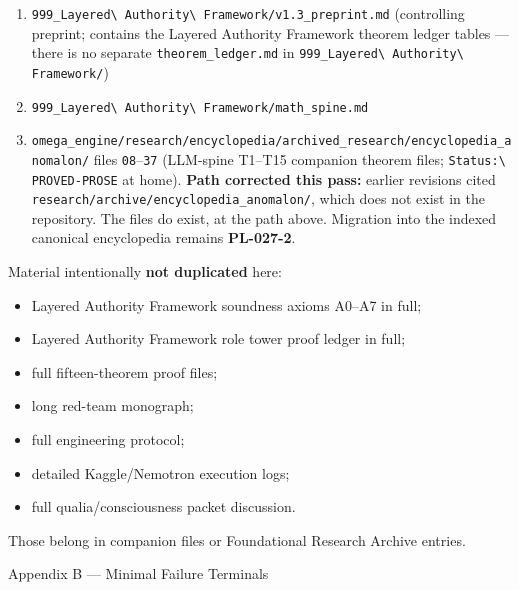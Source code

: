 \documentclass[
  10pt,
]{article}
\providecommand{\tightlist}{%
  \setlength{\itemsep}{0pt}\setlength{\parskip}{0pt}}
\providecommand{\tightlist}{%
  \setlength{\itemsep}{0pt}\setlength{\parskip}{0pt}}
\DeclareRobustCommand{\texttt}[1]{{\paperSymbolFont\nolinkurl{#1}}}
\begin{document}
\begin{enumerate}
\def\labelenumi{\arabic{enumi}.}
\tightlist
\item
  \texttt{999\_Layered\ Authority\ Framework/v1.3\_preprint.md} (controlling preprint; contains the Layered Authority Framework theorem ledger tables --- there is no separate \texttt{theorem\_ledger.md} in \texttt{999\_Layered\ Authority\ Framework/})
\item
  \texttt{999\_Layered\ Authority\ Framework/math\_spine.md}
\item
  \texttt{omega\_engine/research/encyclopedia/archived\_research/encyclopedia\_anomalon/} files \texttt{08}--\texttt{37} (LLM-spine T1--T15 companion theorem files; \texttt{Status:\ PROVED-PROSE} at home). \textbf{Path corrected this pass:} earlier revisions cited \texttt{research/archive/encyclopedia\_anomalon/}, which does not exist in the repository. The files do exist, at the path above. Migration into the indexed canonical encyclopedia remains \textbf{PL-027-2}.
\end{enumerate}

Material intentionally \textbf{not duplicated} here:

\begin{itemize}
\tightlist
\item
  Layered Authority Framework soundness axioms A0--A7 in full;
\item
  Layered Authority Framework role tower proof ledger in full;
\item
  full fifteen-theorem proof files;
\item
  long red-team monograph;
\item
  full engineering protocol;
\item
  detailed Kaggle/Nemotron execution logs;
\item
  full qualia/consciousness packet discussion.
\end{itemize}

Those belong in companion files or Foundational Research Archive entries.

Appendix B --- Minimal Failure Terminals
\end{document}
